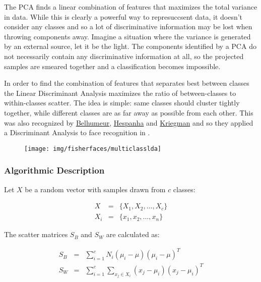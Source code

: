 The PCA finds a linear combination of features that maximizes the total variance in data. While this is clearly a powerful way to represuccsent data, it doesn't consider any classes and so a lot of discriminative information may be lost when throwing components away. Imagine a situation where the variance is generated by an external source, let it be the light. The components identified by a PCA do not necessarily contain any discriminative information at all, so the projected samples are smeared together and a classification becomes impossible.

In order to find the combination of features that separates best between classes the Linear Discriminant Analysis maximizes the ratio of between-classes to within-classes scatter. The idea is simple: same classes should cluster tightly together, while different classes are as far away as possible from each other. This was also recognized by \href{http://www.cs.columbia.edu/~belhumeur/}{Belhumeur}, \href{http://www.ece.ucsb.edu/~hespanha/}{Hespanha} and \href{http://cseweb.ucsd.edu/~kriegman/}{Kriegman} and so they applied a Discriminant Analysis to face recognition in \cite{belhumeru97}. 

\begin{figure}
	\begin{center}
		\texttt{[image: img/fisherfaces/multiclasslda]}
		\label{fig:scatter_matrices}
	\end{center}
\end{figure}

\subsubsection{Algorithmic Description}

Let $X$ be a random vector with samples drawn from $c$ classes:

\begin{eqnarray}
X & = & \{X_1,X_2,\ldots,X_c\} \\
X_i & = & \{x_1, x_2, \ldots, x_n\}
\end{eqnarray}

The scatter matrices $S_{B}$ and $S_{W}$ are calculated as:

\begin{eqnarray}
\label{eqn:scatter_matrices}
S_{B} & = & \sum_{i=1}^{c} N_{i} (\mu_i - \mu)(\mu_i - \mu)^{T} \\
S_{W} & = & \sum_{i=1}^{c} \sum_{x_{j} \in X_{i}} (x_j - \mu_i)(x_j - \mu_i)^{T}
\end{eqnarray}

